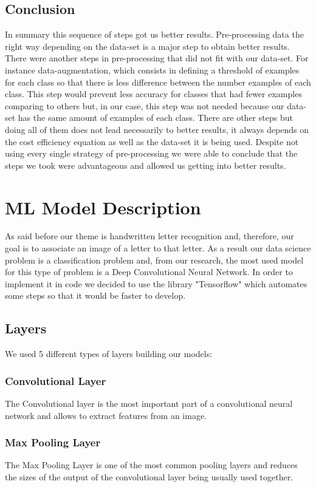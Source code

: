 \documentclass[conference]{IEEEtran}
\begin{document}
\subsection{Conclusion}
In summary this sequence of steps got us better results. Pre-processing data the right way depending on the data-set is a major step to obtain better results. There were another steps in pre-processing that did not fit with our data-set. For instance data-augmentation, which consists in defining a threshold of examples for each class so that there is less difference between the number examples of each class. This step would prevent less accuracy for classes that had fewer examples comparing to others but, in our case, this step was not needed because our data-set has the same amount of examples of each class. There are other steps but doing all of them does not lead necessarily to better results, it always depends on the cost efficiency equation as well as the data-set it is being used. Despite not using every single strategy of pre-processing we were able to conclude that the steps we took were advantageous and allowed us getting into better results.


\section{ML Model Description}
As said before our theme is handwritten letter recognition and, therefore, our goal is to associate an image of a letter to that letter. As a result our data science problem is a classification problem and, from our research, the most used model for this type of problem is a Deep Convolutional Neural Network. In order to implement it in code we decided to use the library "Tensorflow" which automates some steps so that it would be faster to develop.

\subsection{Layers \cite{G}} We used 5 different types of layers building our models:

\subsubsection{Convolutional Layer} The Convolutional layer is the most important part of a convolutional neural network and allows to extract features from an image.

\subsubsection{Max Pooling Layer} The Max Pooling Layer is one of the most common pooling layers and reduces the sizes of the output of the convolutional layer being usually used together.
\end{document}
